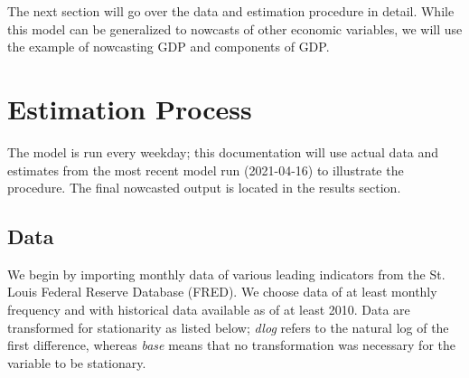 \documentclass[11pt, letterpaper]{article}\usepackage[]{graphicx}\usepackage[]{color}
\begin{document}
The next section will go over the data and estimation procedure in detail. While this model can be generalized to nowcasts of other economic variables, we will use the example of nowcasting GDP and components of GDP.

\newpage
\section{Estimation Process}
The model is run every weekday; this documentation will use actual data and estimates from the most recent model run (2021-04-16) to illustrate the procedure. The final nowcasted output is located in the results section.

\subsection{Data}
We begin by importing monthly data of various leading indicators from the St. Louis Federal Reserve Database (FRED). We choose data of at least monthly frequency and with historical data available as of at least 2010. Data are transformed for stationarity as listed below; \textit{dlog} refers to the natural log of the first difference, whereas \textit{base} means that no transformation was necessary for the variable to be stationary.
\end{document}
